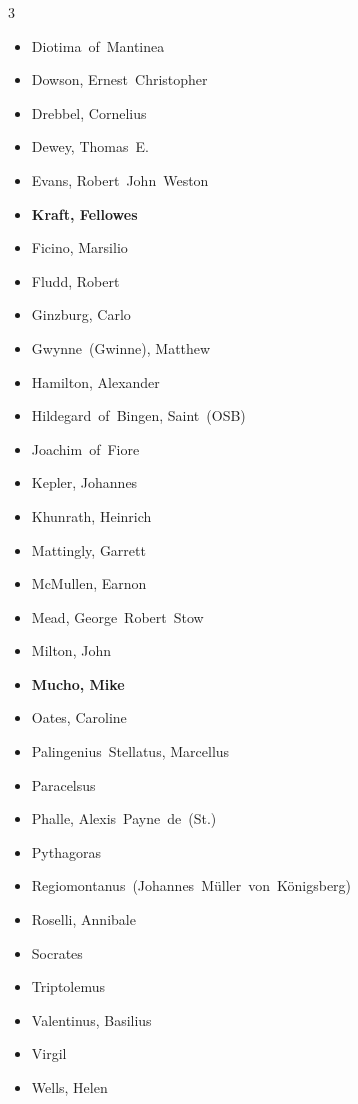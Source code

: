 \documentclass[10pt,makeidx]{extreport}
\begin{document}
\begin{multicols}{3}
\begin{itemize}
  \item Diotima~of~Mantinea
  \item Dowson, Ernest~Christopher
  \item Drebbel, Cornelius
  \item Dewey, Thomas~E.
  \item Evans, Robert~John~Weston
  \item \textbf{Kraft, Fellowes}
  \item Ficino, Marsilio
  \item Fludd, Robert
  \item Ginzburg, Carlo
  \item Gwynne~(Gwinne), Matthew
  \item Hamilton, Alexander
  \item Hildegard~of~Bingen, Saint~(OSB)
  \item Joachim~of~Fiore
  \item Kepler, Johannes
  \item Khunrath, Heinrich
  \item Mattingly, Garrett
  \item McMullen, Earnon
  \item Mead, George~Robert~Stow
  \item Milton, John
  \item \textbf{Mucho, Mike}
  \item Oates, Caroline
  \item Palingenius~Stellatus, Marcellus
  \item Paracelsus
  \item Phalle, Alexis~Payne~de~(St.)
  \item Pythagoras
  \item Regiomontanus~(Johannes~Müller~von~Königsberg)
  \item Roselli, Annibale
  \item Socrates
  \item Triptolemus
  \item Valentinus, Basilius
  \item Virgil
  \item Wells, Helen
\end{itemize}
\end{multicols}
\end{document}
